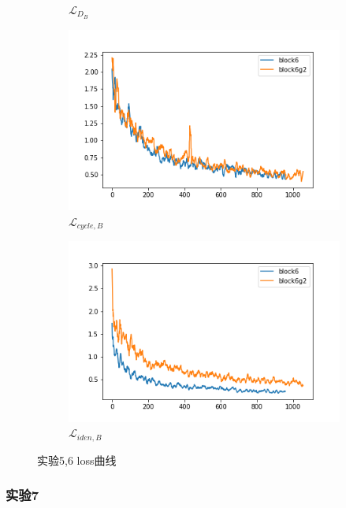 \documentclass[twocolumn,11pt]{ctexart}
\begin{document}
\begin{figure}[htb]
\begin{subfigure}[b]{0.23\linewidth}
        \caption{$\mathcal{L}_{D_B}$}
      \end{subfigure}
      \begin{subfigure}[b]{0.23\linewidth}
        \includegraphics[width=\linewidth]{exp6_cycle_B.png}
        \caption{$\mathcal{L}_{cycle,B}$}
      \end{subfigure}
      \begin{subfigure}[b]{0.23\linewidth}
        \includegraphics[width=\linewidth]{exp6_idt_B.png}
        \caption{$\mathcal{L}_{iden,B}$}
      \end{subfigure}
      \caption{实验5,6 loss曲线}
      \label{fig:exp6loss}
\end{figure}

\subsubsection{实验7}
\end{document}
